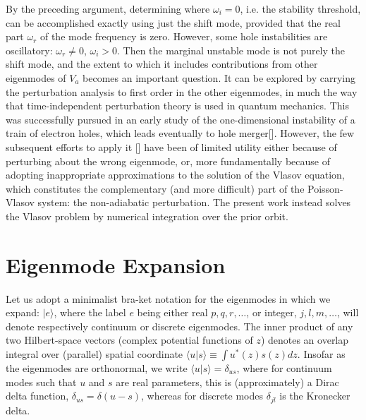 \documentclass[12pt]{article}
\def\ket#1{|#1\rangle}
\def\bra#1{\langle#1}
\begin{document}
By the preceding argument, determining where $\omega_i=0$, i.e. the
stability threshold, can be accomplished exactly using just the shift
mode, provided that the real part $\omega_r$ of the mode frequency is
zero. However, some hole instabilities are oscillatory:
$\omega_r\not=0$, $\omega_i>0$. Then the marginal unstable mode is not
purely the shift mode, and the extent to which it includes
contributions from other eigenmodes of $V_a$ becomes an important
question. It can be explored by carrying the perturbation analysis to
first order in the other eigenmodes, in much the way that
time-independent perturbation theory is used in quantum
mechanics. This was successfully pursued in an early study of the
one-dimensional instability of a train of electron holes, which leads
eventually to hole merger[]. However, the few subsequent efforts to
apply it [] have been of limited utility either because of perturbing
about the wrong eigenmode, or, more fundamentally because of adopting
inappropriate approximations to the solution of the Vlasov equation,
which constitutes the complementary (and more difficult) part of the
Poisson-Vlasov system: the non-adiabatic perturbation. The present
work instead solves the Vlasov problem by numerical integration over
the prior orbit.


\section{Eigenmode Expansion}
Let us adopt a minimalist bra-ket notation for the eigenmodes in which
we expand: $\ket{e}$, where the label $e$ being either real
$p,q,r,\dots$, or integer, $j,l,m,\dots$, will denote respectively
continuum or discrete eigenmodes. The inner product of any two
Hilbert-space vectors (complex potential functions of $z$) denotes an
overlap integral over (parallel) spatial coordinate
$\bra{u}\ket{s}\equiv \int u^*(z)s(z)dz$. Insofar as the eigenmodes
are orthonormal, we write $\bra{u}\ket{s}=\delta_{us}$, where for
continuum modes such that $u$ and $s$ are real parameters, this is
(approximately) a Dirac delta function, $\delta_{us}=\delta(u-s)$,
whereas for discrete modes $\delta_{jl}$ is the Kronecker delta.
\end{document}
